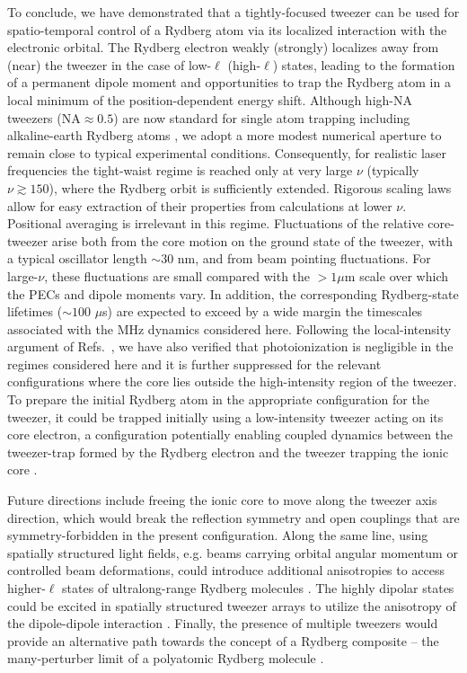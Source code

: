 \documentclass[aps,prl,groupedaddress,superscriptaddress,twocolumn,10pt,longbibliography]{revtex4-2}
\begin{document}
To conclude, we have demonstrated that a tightly-focused tweezer can be used for spatio-temporal control of a Rydberg atom via its localized interaction with the electronic orbital.
The Rydberg electron weakly (strongly) localizes away from (near) the tweezer in the case of low-$\ell$ (high-$\ell$) states, leading to the formation of a permanent dipole moment and opportunities to trap the Rydberg atom in a local minimum of the position-dependent energy shift. Although high-NA tweezers ($\mathrm{NA} \approx 0.5$) are now standard for single atom trapping \cite{Endres2016,Barredo2016} including alkaline-earth Rydberg atoms \cite{Holzl2024,Wilson2022}, we adopt a more modest numerical aperture to remain close to typical experimental conditions. Consequently, for realistic laser frequencies the tight-waist regime is reached only at very large $\nu$ (typically $\nu \gtrsim 150$), where the Rydberg orbit is sufficiently extended.
Rigorous scaling laws allow for easy extraction of their properties from calculations at lower $\nu$. Positional averaging is irrelevant in this regime. Fluctuations of the relative core-tweezer arise both from the core motion on the ground state of the tweezer, with a typical oscillator length $\sim 30$ nm, and from beam pointing fluctuations. For large-$\nu$, these fluctuations are small compared with the $>1\mu$m scale over which the PECs and dipole moments vary. In addition, the corresponding Rydberg-state lifetimes ($\sim 100$ $\mu$s) are expected to exceed by a wide margin the timescales associated with the MHz dynamics considered here. Following the local-intensity argument of Refs.~\cite{Younge_2010,Cardman_2021}, we have also verified  that photoionization is negligible in the regimes considered here and it is further suppressed for the relevant configurations where the core lies outside the high-intensity region of the tweezer. To prepare the initial Rydberg atom in the appropriate configuration for the tweezer, it could be trapped initially using a low-intensity tweezer acting on its core electron, a configuration potentially enabling coupled dynamics between the tweezer-trap formed by the Rydberg electron and the tweezer trapping the ionic core \cite{pendse2025transferring}.

Future directions include freeing the ionic core to move along the tweezer axis direction, which would break the reflection symmetry and open couplings that are symmetry-forbidden in the present configuration. Along the same line, using spatially structured light fields, e.g. beams carrying orbital angular momentum \cite{Rodrigues2016, Mukherjee2018} or controlled beam deformations, could introduce additional anisotropies to access higher-$\ell$ states of ultralong-range Rydberg molecules \cite{Hamilton_2002, Giannakeas2020}.
 The highly dipolar states could be excited in spatially structured tweezer arrays to utilize the anisotropy of the dipole-dipole interaction \cite{Eiles2017,Rivera2021}.
 Finally, the presence of multiple tweezers would provide an alternative path towards the concept of a Rydberg composite -- the many-perturber limit of a polyatomic Rydberg molecule \cite{Hunter2020,Eiles2023,Eiles2024}.
\end{document}
